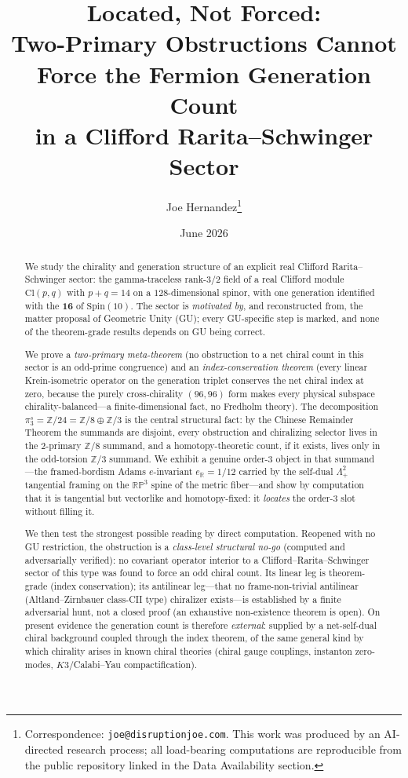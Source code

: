 \documentclass[11pt]{article}
\title{Located, Not Forced:\\
Two-Primary Obstructions Cannot Force the Fermion Generation Count\\
in a Clifford Rarita--Schwinger Sector}
\author{Joe Hernandez\thanks{Correspondence: \texttt{joe@disruptionjoe.com}. This work was produced by an
AI-directed research process; all load-bearing computations are reproducible from the public repository linked
in the Data Availability section.}}
\date{June 2026}
\theoremstyle{definition}
\theoremstyle{remark}
\newcommand{\Z}{\mathbb{Z}}
\newcommand{\R}{\mathbb{R}}
\newcommand{\RP}{\mathbb{RP}}
\newcommand{\pis}{\pi_3^{s}}
\newcommand{\Cl}{\mathrm{Cl}}
\newcommand{\Spin}{\mathrm{Spin}}
\newcommand{\Lamp}{\Lambda^2_{+}}
\newcommand{\eR}{e_{\R}}
\begin{document}
\maketitle

\begin{center}
\end{center}

\begin{abstract}
We study the chirality and generation structure of an explicit real Clifford Rarita--Schwinger sector: the
gamma-traceless rank-$3/2$ field of a real Clifford module $\Cl(p,q)$ with $p+q=14$ on a $128$-dimensional
spinor, with one generation identified with the $\mathbf{16}$ of $\Spin(10)$. The sector is \emph{motivated by},
and reconstructed from, the matter proposal of Geometric Unity (GU); every GU-specific step is marked, and none
of the theorem-grade results depends on GU being correct.

We prove a \emph{two-primary meta-theorem} (no obstruction to a net chiral count in this sector is an odd-prime
congruence) and an \emph{index-conservation theorem} (every linear Krein-isometric operator on the generation
triplet conserves the net chiral index at zero, because the purely cross-chirality $(96,96)$ form makes every
physical subspace chirality-balanced---a finite-dimensional fact, no Fredholm theory). The decomposition $\pis = \Z/24 = \Z/8 \oplus \Z/3$ is the central structural fact: by the Chinese
Remainder Theorem the summands are disjoint, every obstruction and chiralizing selector lives in the $2$-primary
$\Z/8$ summand, and a homotopy-theoretic count, if it exists, lives only in the odd-torsion $\Z/3$ summand. We
exhibit a genuine order-$3$ object in that summand---the framed-bordism Adams $e$-invariant $\eR=1/12$ carried by
the self-dual $\Lamp$ tangential framing on the $\RP^3$ spine of the metric fiber---and show by computation that
it is tangential but vectorlike and homotopy-fixed: it \emph{locates} the order-$3$ slot without filling it.

We then test the strongest possible reading by direct computation. Reopened with no GU restriction, the
obstruction is a \emph{class-level structural no-go} (computed and adversarially verified): no covariant operator
interior to a Clifford--Rarita--Schwinger sector of this type was found to force an odd chiral count. Its linear
leg is theorem-grade (index conservation); its antilinear leg---that no frame-non-trivial antilinear
(Altland--Zirnbauer class-CII type) chiralizer exists---is established by a finite adversarial hunt, not a closed
proof (an exhaustive non-existence theorem is open). On present evidence the generation count is therefore
\emph{external}: supplied by a net-self-dual chiral background coupled through the index theorem, of the same
general kind by which chirality arises in known chiral theories (chiral gauge couplings, instanton zero-modes,
$K3$/Calabi--Yau compactification).


\end{abstract}
\end{document}
